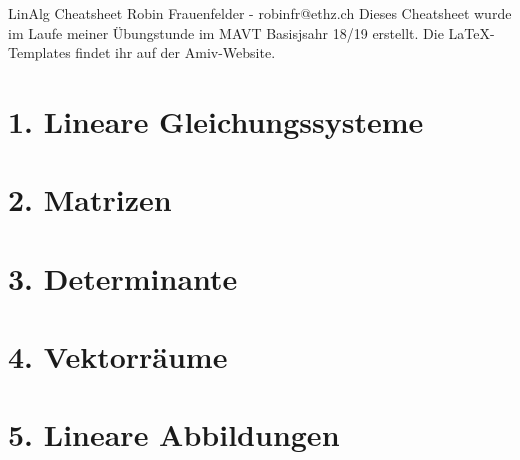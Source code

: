 \documentclass[8pt, a4paper, landscape, xcolor=dvipsnames]{extarticle}
\begin{document}
\begin{multicols*}{4}

\DocumentInfo
{LinAlg Cheatsheet} %
{Robin Frauenfelder - robinfr@ethz.ch} %
{Dieses Cheatsheet wurde im Laufe meiner Übungstunde im MAVT Basisjsahr 18/19 erstellt. Die \LaTeX -Templates findet ihr auf der Amiv-Website.} %
\WhiteSpace

\section{1. Lineare Gleichungssysteme}
\WhiteSpace
	
	
	
\section{2. Matrizen}
\WhiteSpace
	
	
	
	
	
	
	
	
	
	
\section{3. Determinante}
\WhiteSpace
	
	
	
	
	
\section{4. Vektorräume}
\WhiteSpace
	
	
	
	
	
	
	
	
\section{5. Lineare Abbildungen}
\WhiteSpace
	
	
	
	

\end{multicols*}
\end{document}
